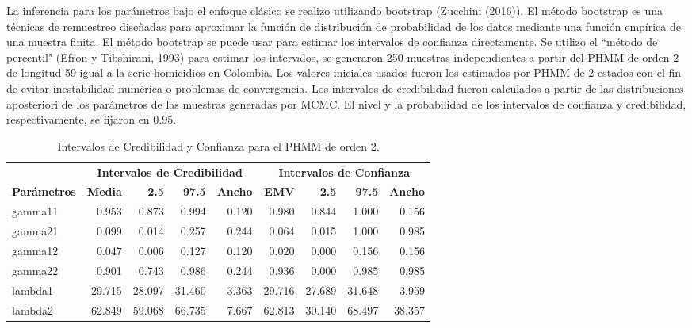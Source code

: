 \documentclass[a4paper]{article}\usepackage[]{graphicx}\usepackage[]{color}
\begin{document}
La inferencia para los parámetros bajo el enfoque clásico se realizo utilizando bootstrap (Zucchini (2016)). El método bootstrap es una técnicas de remuestreo diseñadas para aproximar la función de distribución de probabilidad de los datos mediante una función empírica de una muestra finita. El método bootstrap se puede usar para estimar los intervalos de confianza directamente. Se utilizo el ``método de percentil" (Efron y Tibshirani, 1993) para estimar los intervalos, se generaron 250 muestras independientes a partir del PHMM de orden 2 de longitud 59 igual a la serie homicidios en Colombia. Los valores iniciales usados fueron los estimados por PHMM de 2 estados con el fin de evitar inestabilidad numérica o problemas de convergencia. Los intervalos de credibilidad fueron calculados a partir de las distribuciones aposteriori de los parámetros de las muestras generadas por MCMC. El nivel y la probabilidad de los intervalos de confianza y credibilidad, respectivamente, se fijaron en 0.95.



\begin{table}[ht]
\centering
\begin{tabular}{lrrrrrrrr}
  \toprule
   & \multicolumn{4}{c}{\textbf{Intervalos de Credibilidad}} & \multicolumn{4}{c}{\textbf{Intervalos de Confianza}}\\
 \cmidrule(lr){2-5}\cmidrule(lr){6-9}
 \textbf{Parámetros} & \textbf{Media} & \textbf{2.5} & \textbf{97.5} & \textbf{Ancho} & \textbf{EMV} & \textbf{2.5} & \textbf{97.5} & \textbf{Ancho}\\
 \midrule
gamma11 & 0.953 & 0.873 & 0.994 & 0.120 & 0.980 & 0.844 & 1.000 & 0.156 \\ 
  gamma21 & 0.099 & 0.014 & 0.257 & 0.244 & 0.064 & 0.015 & 1.000 & 0.985 \\ 
  gamma12 & 0.047 & 0.006 & 0.127 & 0.120 & 0.020 & 0.000 & 0.156 & 0.156 \\ 
  gamma22 & 0.901 & 0.743 & 0.986 & 0.244 & 0.936 & 0.000 & 0.985 & 0.985 \\ 
  lambda1 & 29.715 & 28.097 & 31.460 & 3.363 & 29.716 & 27.689 & 31.648 & 3.959 \\ 
  lambda2 & 62.849 & 59.068 & 66.735 & 7.667 & 62.813 & 30.140 & 68.497 & 38.357 \\ 
   \bottomrule
\end{tabular}
\caption{Intervalos de Credibilidad y Confianza para el PHMM de orden 2.} 
\end{table}
\end{document}
